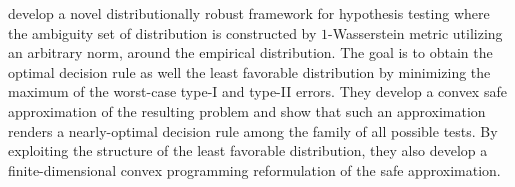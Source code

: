 \documentclass[final,onefignum,onetabnum]{class}
\begin{document}
\citet{gao2018hypothesis}  develop a novel distributionally robust framework  for hypothesis testing where the ambiguity set of distribution is constructed by $1$-Wasserstein metric utilizing an arbitrary norm, around the empirical distribution. The goal is to obtain the optimal decision rule as well the least favorable distribution by minimizing the maximum of the worst-case type-I and type-II errors. 
They  develop a convex safe
approximation of the resulting problem and show that such an approximation
renders a nearly-optimal decision rule among the family of all possible tests.
By exploiting the structure of the least favorable distribution, they also develop a
finite-dimensional convex programming reformulation of the safe  approximation. %


\end{document}
